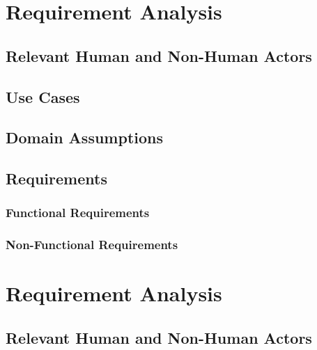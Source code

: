 \documentclass[a4paper,12pt]{article}
\begin{document}
\newpage

\section{Requirement Analysis}

\subsection{Relevant Human and Non-Human Actors}

\subsection{Use Cases}


\subsection{Domain Assumptions}


\subsection{Requirements}
\subsubsection{Functional Requirements}

\subsubsection{Non-Functional Requirements}

\newpage 
\subtitle{Type 2}

\section{Requirement Analysis}

\subsection{Relevant Human and Non-Human Actors}
\end{document}
